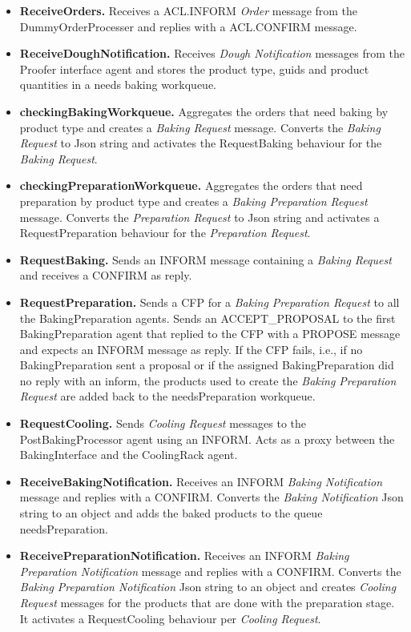 \documentclass[paper=a4, fontsize=11pt]{scrartcl}
\begin{document}
	\begin{itemize}
		\item  \textbf{ReceiveOrders.} Receives a ACL.INFORM \textit{Order} message from the DummyOrderProcesser and replies with a ACL.CONFIRM message.

		\item  \textbf{ReceiveDoughNotification.} Receives \textit{Dough Notification} messages from the Proofer interface agent and stores the product type, guids and product quantities in a needs baking workqueue.

		\item \textbf{checkingBakingWorkqueue.} Aggregates the orders that need baking by product type and creates a \textit{Baking Request} message. Converts the \textit{Baking Request} to Json string and activates the RequestBaking behaviour for the \textit{Baking Request}.

		\item \textbf{checkingPreparationWorkqueue.} Aggregates the orders that need preparation by product type and creates a \textit{Baking Preparation Request} message. Converts the \textit{Preparation Request} to Json string and activates a RequestPreparation behaviour for the \textit{Preparation Request}.

		\item \textbf{RequestBaking.} Sends an INFORM message containing a \textit{Baking Request} and receives a CONFIRM as reply.

		\item \textbf{RequestPreparation.} Sends a CFP for a \textit{Baking Preparation Request} to all the BakingPreparation agents. Sends an ACCEPT\_PROPOSAL to the first BakingPreparation agent that replied to the CFP with a PROPOSE message and expects an INFORM message as reply. If the CFP fails, i.e., if no BakingPreparation sent a proposal or if the assigned BakingPreparation did no reply with an inform, the products used to create the \textit{Baking Preparation Request} are added back to the needsPreparation workqueue.

		\item \textbf{RequestCooling.} Sends \textit{Cooling Request} messages to the PostBakingProcessor agent using an INFORM. Acts as a proxy between the BakingInterface and the CoolingRack agent.

		\item \textbf{ReceiveBakingNotification.} Receives an INFORM \textit{Baking Notification} message and replies with a CONFIRM. Converts the \textit{Baking Notification} Json string to an object and adds the baked products to the queue needsPreparation.

		\item \textbf{ReceivePreparationNotification.} Receives an INFORM \textit{Baking Preparation Notification} message and replies with a CONFIRM. Converts the \textit{Baking Preparation Notification} Json string to an object and creates \textit{Cooling Request} messages for the products that are done with the preparation stage. It activates a RequestCooling behaviour per \textit{Cooling Request}.

	\end{itemize}
\end{document}
